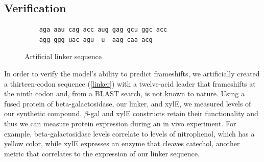 \documentclass[12pt, draft]{article}
\numberwithin{equation}{section}
\begin{document}


\subsection{Verification}

\begin{figure}
  \caption{Artificial linker sequence}
  \label{linker}
  \begin{verbatim}
    aga aau cag acc aug gag gcu ggc acc 
    agg ggg uac agu  u  aag caa acg
  \end{verbatim}
\end{figure}

In order to verify the model's ability to predict frameshifts, we
artificially created a thirteen-codon sequence (\autoref{linker})
with a twelve-acid leader that frameshifts at the ninth codon and,
from a BLAST search, is not known to nature.  Using a fused protein of
beta-galactosidase, our linker, and xylE, we measured levels of our
synthetic compound. $\beta$-gal and xylE constructs retain their
functionality and thus we can measure protein expression during an in
vivo experiment. For example, beta-galactosidase levels correlate to
levels of nitrophenol, which has a yellow color, while xylE expresses
an enzyme that cleaves catechol, another metric that correlates to the
expression of our linker sequence.


\begin{singlespace}
  
\end{singlespace}
\end{document}
